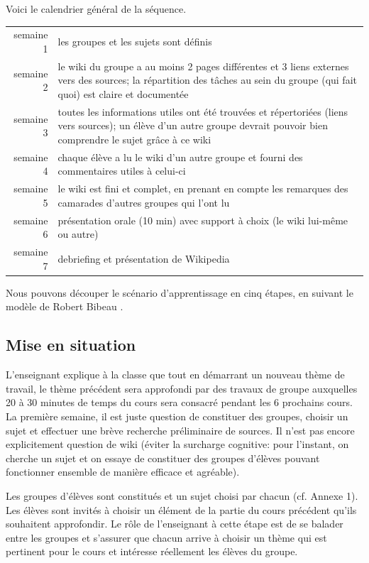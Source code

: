 \documentclass[11pt,bibliography=totoc]{scrartcl}
\begin{document}
Voici le calendrier général de la séquence.
\begin{center}
\begin{tabular}{rp{}}
  semaine 1& les groupes et les sujets sont définis\\
  semaine 2& le wiki du groupe a au moins 2 pages différentes et 3 liens
              externes vers des sources;
              la répartition des tâches au sein du groupe (qui fait quoi) est claire et documentée\\
  semaine 3& toutes les informations utiles ont été trouvées et répertoriées
              (liens vers sources);
              un élève d'un autre groupe devrait pouvoir bien comprendre le sujet grâce à ce wiki\\
  semaine 4& chaque élève a lu le wiki d'un autre groupe et fourni des commentaires utiles à celui-ci\\
  semaine 5& le wiki est fini et complet, en prenant en compte les remarques des
             camarades d'autres groupes qui l'ont lu\\
  semaine 6& présentation orale (10 min) avec support à choix (le wiki lui-même
             ou autre)\\
  semaine 7& debriefing et présentation de Wikipedia
\end{tabular}  
\end{center}

Nous pouvons découper le scénario d'apprentissage en cinq étapes, en suivant le
modèle de Robert Bibeau \autocite{bibeau}.

\subsection{Mise en situation}
L'enseignant explique à la classe que tout en démarrant un nouveau thème de
travail, le thème précédent sera approfondi par des travaux de groupe auxquelles
20 à 30 minutes de temps du cours sera consacré pendant les 6 prochains cours.
La première semaine, il est juste question de constituer des groupes, choisir un
sujet et effectuer une brève recherche préliminaire de sources. Il n'est pas
encore explicitement question de wiki (éviter la surcharge cognitive: pour
l'instant, on cherche un sujet et on essaye de constituer des groupes d'élèves
pouvant fonctionner ensemble de manière efficace et agréable).

Les groupes d'élèves sont constitués et un sujet choisi par chacun (cf. Annexe
1). Les élèves sont invités à choisir un élément de la partie du cours précédent
qu'ils souhaitent approfondir. Le rôle de l'enseignant à cette étape est de se
balader entre les groupes et s'assurer que chacun arrive à choisir un thème qui
est pertinent pour le cours et intéresse réellement les élèves du groupe.
\end{document}
